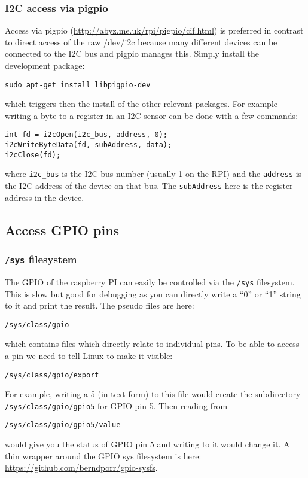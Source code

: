 \documentclass[12pt]{report}
\begin{document}
\subsubsection{I2C access via pigpio}
Access via pigpio (\url{http://abyz.me.uk/rpi/pigpio/cif.html})
is preferred in contrast to direct
access of the raw /dev/i2c because many different devices
can be connected to the I2C bus and pigpio manages this.
Simply install the development package:
\begin{verbatim}
sudo apt-get install libpigpio-dev
\end{verbatim}
which triggers then the install of the other relevant packages.
For example writing a byte to a register in an I2C sensor can be done with a
few commands:
\begin{verbatim}
int fd = i2cOpen(i2c_bus, address, 0);
i2cWriteByteData(fd, subAddress, data);
i2cClose(fd);
\end{verbatim}
where \texttt{i2c\_bus} is the I2C bus number (usually 1 on the RPI)
and the \texttt{address} is the I2C address of the device on that bus.
The \texttt{subAddress} here is the register address in the device.

\subsection{Access GPIO pins}
\subsubsection{\texttt{/sys} filesystem}
The GPIO of the raspberry PI can easily be controlled via
the \texttt{/sys} filesystem. This is slow but good for
debugging as you can directly write a
``0'' or ``1'' string to it and print the result. The
pseudo files are here:
\begin{verbatim}
/sys/class/gpio
\end{verbatim}
which contains files which directly relate to individual pins.
To be able to access a pin we need to tell Linux to make
it visible:
\begin{verbatim}
/sys/class/gpio/export
\end{verbatim}
For example, writing a 5 (in text form) to this file would
create the subdirectory \texttt{/sys/class/gpio/gpio5} for GPIO pin 5.
Then reading from
\begin{verbatim}
/sys/class/gpio/gpio5/value
\end{verbatim}
would give you the status of GPIO pin 5 and writing
to it would change it.
A thin wrapper around the GPIO sys filesystem is here: \url{https://github.com/berndporr/gpio-sysfs}.
\end{document}
